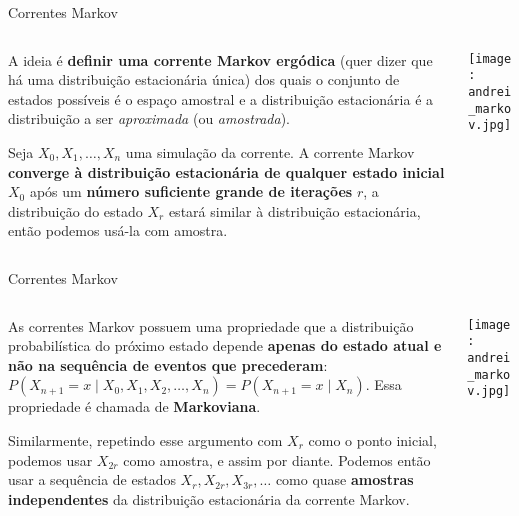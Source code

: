 \begin{frame}{Correntes Markov}
  \begin{columns}
    \begin{column}{0.8\textwidth}
      \begin{vfilleditems}
        \item A ideia é \textbf{definir uma corrente Markov ergódica}
        (quer dizer que há uma distribuição estacionária única)
        dos quais o conjunto de estados possíveis é o espaço amostral e a
        distribuição estacionária é a distribuição a ser \textit{aproximada} (ou \textit{amostrada}).
        \item Seja $X_0, X_1, \dots, X_n$ uma simulação da corrente.
        A corrente Markov \textbf{converge à distribuição estacionária de qualquer
        estado inicial} $X_0$ após um \textbf{número suficiente grande de iterações} $r$,
        a distribuição do estado $X_r$ estará similar à distribuição estacionária,
        então podemos usá-la com amostra.
      \end{vfilleditems}
    \end{column}
    \begin{column}{0.2\textwidth}
      \centering
      \texttt{[image: andrei\_markov.jpg]}
    \end{column}
  \end{columns}
\end{frame}

\begin{frame}{Correntes Markov}
  \begin{columns}
    \begin{column}{0.8\textwidth}
      \begin{vfilleditems}
        \item As correntes Markov possuem uma propriedade que a distribuição probabilística
        do próximo estado depende \textbf{apenas do estado atual e não na sequência
        de eventos que precederam}:
        $P(X_{n+1}=x \mid X_{0},X_{1},X_{2},\ldots ,X_{n}) = P(X_{n+1}=x \mid X_{n})$.
        Essa propriedade é chamada de \textbf{Markoviana}.
        \item Similarmente, repetindo esse argumento com $X_r$ como o ponto inicial,
        podemos usar $X_{2r}$ como amostra, e assim por diante.
        Podemos então usar a sequência de estados $X_r, X_{2r}, X_{3r}, \dots$
        como quase \textbf{amostras independentes} da distribuição estacionária da
        corrente Markov.
      \end{vfilleditems}
    \end{column}
    \begin{column}{0.2\textwidth}
      \centering
      \texttt{[image: andrei\_markov.jpg]}
    \end{column}
  \end{columns}
\end{frame}

